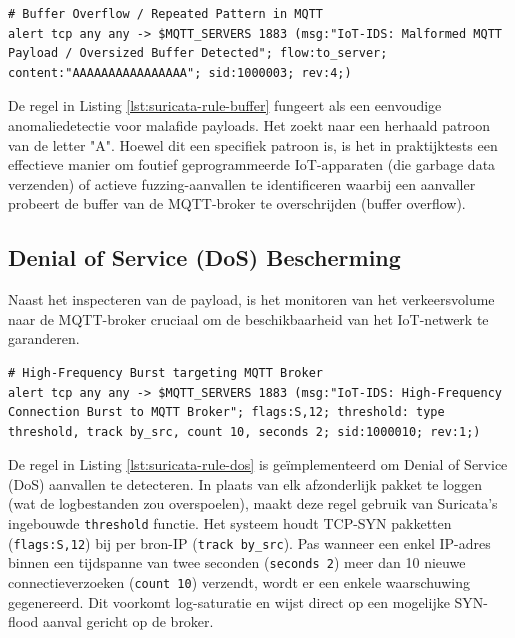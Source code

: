 \begin{listing}[H]
\begin{verbatim}
# Buffer Overflow / Repeated Pattern in MQTT
alert tcp any any -> $MQTT_SERVERS 1883 (msg:"IoT-IDS: Malformed MQTT Payload / Oversized Buffer Detected"; flow:to_server; content:"AAAAAAAAAAAAAAAA"; sid:1000003; rev:4;)
\end{verbatim}
\caption{Suricata-regel voor het detecteren van een mogelijke buffer overflow.}
\label{lst:suricata-rule-buffer}
\end{listing}

De regel in Listing \ref{lst:suricata-rule-buffer} fungeert als een eenvoudige anomaliedetectie voor malafide payloads. Het zoekt naar een herhaald patroon van de letter "A". Hoewel dit een specifiek patroon is, is het in praktijktests een effectieve manier om foutief geprogrammeerde IoT-apparaten (die garbage data verzenden) of actieve fuzzing-aanvallen te identificeren waarbij een aanvaller probeert de buffer van de MQTT-broker te overschrijden (buffer overflow).

\subsection{Denial of Service (DoS) Bescherming}
Naast het inspecteren van de payload, is het monitoren van het verkeersvolume naar de MQTT-broker cruciaal om de beschikbaarheid van het IoT-netwerk te garanderen.

\begin{listing}[H]
\begin{verbatim}
# High-Frequency Burst targeting MQTT Broker
alert tcp any any -> $MQTT_SERVERS 1883 (msg:"IoT-IDS: High-Frequency Connection Burst to MQTT Broker"; flags:S,12; threshold: type threshold, track by_src, count 10, seconds 2; sid:1000010; rev:1;)
\end{verbatim}
\caption{Suricata-regel voor het detecteren van een high-frequency SYN-flood (DoS).}
\label{lst:suricata-rule-dos}
\end{listing}

De regel in Listing \ref{lst:suricata-rule-dos} is geïmplementeerd om Denial of Service (DoS) aanvallen te detecteren. In plaats van elk afzonderlijk pakket te loggen (wat de logbestanden zou overspoelen), maakt deze regel gebruik van Suricata's ingebouwde \texttt{threshold} functie. Het systeem houdt TCP-SYN pakketten (\texttt{flags:S,12}) bij per bron-IP (\texttt{track by\_src}). Pas wanneer een enkel IP-adres binnen een tijdspanne van twee seconden (\texttt{seconds 2}) meer dan 10 nieuwe connectieverzoeken (\texttt{count 10}) verzendt, wordt er een enkele waarschuwing gegenereerd. Dit voorkomt log-saturatie en wijst direct op een mogelijke SYN-flood aanval gericht op de broker.


